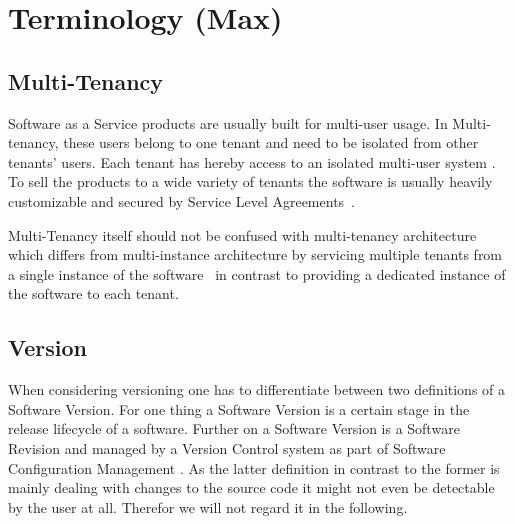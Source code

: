 \section{Terminology (Max)}
\label{sec:terminology}

\subsection{Multi-Tenancy}

Software as a Service products are usually built for multi-user usage. In Multi-tenancy, these users belong to one tenant and need to be isolated from other tenants' users. Each tenant has hereby access to an isolated multi-user system \cite{Chong2006a}. To sell the products to a wide variety of tenants the software is usually heavily customizable and secured by Service Level Agreements~\cite{Bezemer2010}.

Multi-Tenancy itself should not be confused with multi-tenancy architecture which differs from multi-instance architecture by servicing multiple tenants from a single instance of the software~\cite{Shao2011} in contrast to providing a dedicated instance of the software to each tenant.

\subsection{Version}

When considering versioning one has to differentiate between two definitions of a Software Version.
For one thing a Software Version is a certain stage in the release lifecycle of a software.
Further on a Software Version is a Software Revision and managed by a Version Control system as part of Software Configuration Management \cite{swebook}.
As the latter definition in contrast to the former is mainly dealing with changes to the source code it might not even be detectable by the user at all.
Therefor we will not regard it in the following.


